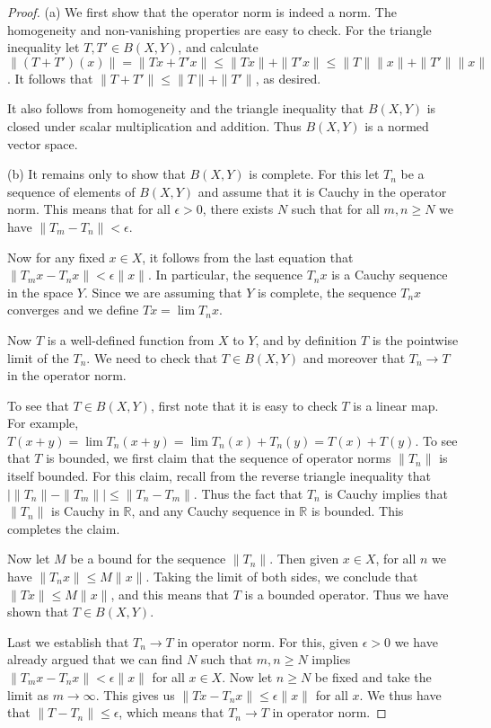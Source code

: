 \documentclass[11pt,oneside]{amsbook}
\newcommand{\RR}{{\mathbb R}}
\theoremstyle{definition}
\theoremstyle{plain}
\theoremstyle{definition}
\theoremstyle{remark}
\numberwithin{equation}{section}
\numberwithin{figure}{section}
\begin{document}
\begin{proof}
  (a) We first show that the operator norm is indeed a norm. The homogeneity and non-vanishing properties are easy to check. For the triangle inequality let $T,T'\in B(X,Y)$, and calculate $\|(T+T')(x)\|=\|Tx+T'x\|\leq\|Tx\|+\|T'x\|\leq\|T\|\|x\|+\|T'\|\|x\|$. It follows that $\|T+T'\|\leq\|T\|+\|T'\|$, as desired.

  It also follows from homogeneity and the triangle inequality that $B(X,Y)$ is closed under scalar multiplication and addition. Thus $B(X,Y)$ is a normed vector space.
  
  (b) It remains only to show that $B(X,Y)$ is complete. For this let $T_n$ be a sequence of elements of $B(X,Y)$ and assume that it is Cauchy in the operator norm. This means that for all $\epsilon>0$, there exists $N$ such that for all $m,n\geq N$ we have $\|T_m-T_n\|<\epsilon$.

  Now for any fixed $x\in X$, it follows from the last equation that $\|T_mx-T_nx\|<\epsilon\|x\|$. In particular, the sequence $T_nx$ is a Cauchy sequence in the space $Y$. Since we are assuming that $Y$ is complete, the sequence $T_nx$ converges and we define $Tx=\lim T_nx$.

  Now $T$ is a well-defined function from $X$ to $Y$, and by definition $T$ is the pointwise limit of the $T_n$. We need to check that $T\in B(X,Y)$ and moreover that $T_n\to T$ in the operator norm.

  To see that $T\in B(X,Y)$, first note that it is easy to check $T$ is a linear map. For example, $T(x+y)=\lim T_n(x+y)=\lim T_n(x)+T_n(y)=T(x)+T(y)$. To see that $T$ is bounded, we first claim that the sequence of operator norms $\|T_n\|$ is itself bounded. For this claim, recall from the reverse triangle inequality that $|\|T_n\|-\|T_m\||\leq\|T_n-T_m\|$. Thus the fact that $T_n$ is Cauchy implies that $\|T_n\|$ is Cauchy in $\RR$, and any Cauchy sequence in $\RR$ is bounded. This completes the claim.
  
  Now let $M$ be a bound for the sequence $\|T_n\|$. Then given $x\in X$, for all $n$ we have $\|T_nx\|\leq M\|x\|$. Taking the limit of both sides, we conclude that $\|Tx\|\leq M\|x\|$, and this means that $T$ is a bounded operator. Thus we have shown that $T\in B(X,Y)$.

  Last we establish that $T_n\to T$ in operator norm. For this, given $\epsilon>0$ we have already argued that we can find $N$ such that $m,n\geq N$ implies $\|T_mx-T_nx\|<\epsilon\|x\|$ for all $x\in X$. Now let $n\geq N$ be fixed and take the limit as $m\to\infty$. This gives us $\|Tx-T_nx\|\leq\epsilon\|x\|$ for all $x$. We thus have that $\|T-T_n\|\leq\epsilon$, which means that $T_n\to T$ in operator norm.
\end{proof}
\end{document}
